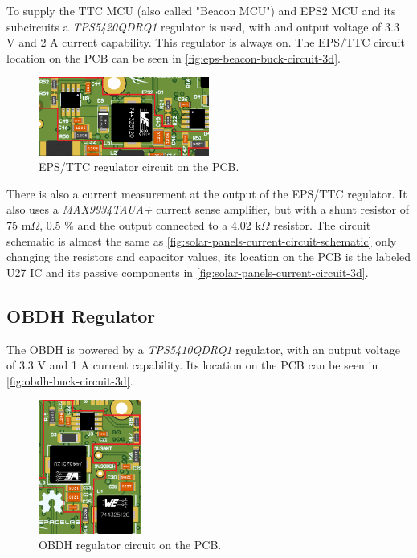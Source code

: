 To supply the TTC MCU (also called "Beacon MCU") and EPS2 MCU and its subcircuits a \textit{TPS5420QDRQ1} regulator is used, with and output voltage of 3.3 V and 2 A current capability. This regulator is always on.
The EPS/TTC circuit location on the PCB can be seen in \autoref{fig:eps-beacon-buck-circuit-3d}.

\begin{figure}[!ht]
    \begin{center}
        \includegraphics[width=0.5\textwidth]{figures/eps-beacon-buck-circuit-3d.png}
        \caption{EPS/TTC regulator circuit on the PCB.}
        \label{fig:eps-beacon-buck-circuit-3d}
    \end{center}
\end{figure}

There is also a current measurement at the output of the EPS/TTC regulator. It also uses a \textit{MAX9934TAUA+} current sense amplifier, but with a shunt resistor of 75 m$\Omega$, 0.5 \% and the output connected to a 4.02 k$\Omega$ resistor.
The circuit schematic is almost the same as \autoref{fig:solar-panels-current-circuit-schematic} only changing the resistors and capacitor values, its location on the PCB is the labeled U27 IC and its passive components in \autoref{fig:solar-panels-current-circuit-3d}.

\subsection{OBDH Regulator}

The OBDH is powered by a \textit{TPS5410QDRQ1} regulator, with an output voltage of 3.3 V and 1 A current capability.
Its location on the PCB can be seen in \autoref{fig:obdh-buck-circuit-3d}.

\begin{figure}[!ht]
    \begin{center}
        \includegraphics[width=0.3\textwidth]{figures/obdh-buck-circuit-3d.png}
        \caption{OBDH regulator circuit on the PCB.}
        \label{fig:obdh-buck-circuit-3d}
    \end{center}
\end{figure}

